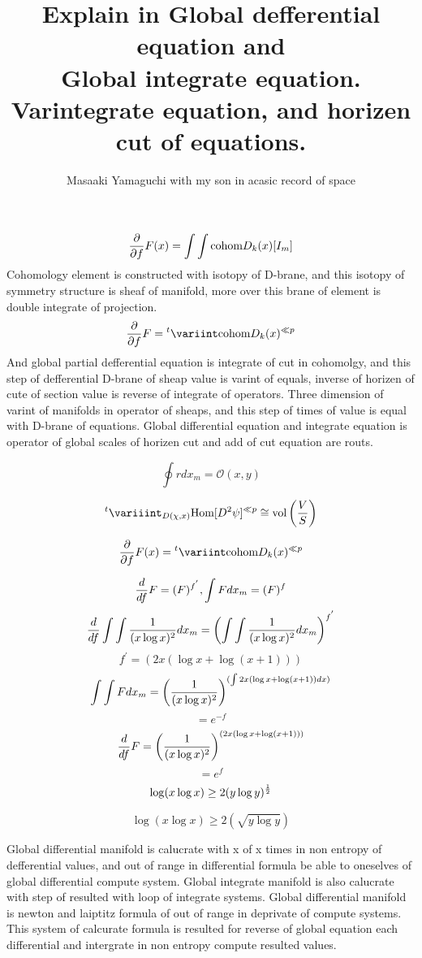 \documentclass{jsarticle}
\begin{document}
{\newpage
\title{Explain in Global defferential equation and \\
Global integrate equation. \\
Varintegrate equation, and horizen cut of equations.}
\author{Masaaki Yamaguchi with my son in acasic record of space}




 $$ {\partial \over \partial f}F(x) = \int \int \text{cohom}D_k(x)[I_m]  $$
 Cohomology element is constructed with isotopy of D-brane,
 and this isotopy of symmetry structure is sheaf of manifold,
 more over this brane of element is double integrate of projection.
 $$ {\partial \over \partial f}F = {{}^t \variint} \text{cohom}D_k(x)^{\ll p} $$
 And global partial defferential equation is integrate of cut in cohomolgy,
 and this step of defferential D-brane of sheap value is varint of equals,
 inverse of horizen of cute of section value is reverse of integrate of 
 operators. Three dimension of varint of manifolds in operator of sheaps,
 and this step of times of value is equal with D-brane of equations.
 Global differential equation and integrate equation is operator of 
 global scales of horizen cut and add of cut equation are routs.

 $$ \oint r dx_m = \mathcal{O}(x,y) $$

 $$ {{}^t \variiint}_{{D(\chi,x)}} \text{Hom}[D^2 \psi]^{\ll p} \cong 
 \text{vol}\left({V \over S}\right) $$

 $$ {\partial \over \partial f}F(x) = {{}^t \variint} 
 \text{cohom}D_k(x)^{\ll p} $$

 $$ {d \over df}F = (F)^{f^{'}}, \int F dx_m = (F)^{f}  $$
 $$ {d \over df}\int \int{1 \over (x \log x)^2}dx_m =
 \left(\int \int{1 \over (x \log x)^2}dx_m \right)^{f^{'}}  $$
 $$ f^{'} = (2x (\log x + \log (x + 1))) $$
  $$  \int \int F dx_m = \left({1 \over (x \log x)^2}\right)^{
	  (\int 2x (\log x + \log (x + 1))dx)} $$ 
   $$= e^{-f} $$
  $$ {d \over df}F = \left({1 \over (x \log x)^2}\right)^{
	  (2x (\log x + \log (x + 1))) } $$  
  $$= e^{f} $$
  $$ \log (x \log x) \ge 2(y \log y)^{1 \over 2} $$

  $$ \log (x \log x) \ge 2(\sqrt{y \log y}) $$

  Global differential manifold is calucrate with x of x times in non
  entropy of defferential values, and out of range in differential formula
  be able to oneselves of global differential compute system.
  Global integrate manifold is also calucrate with step of resulted with
  loop of integrate systems. Global differential manifold is newton and 
  laiptitz formula of out of range in deprivate of compute systems.
  This system of calcurate formula is resulted for reverse of global equation
  each differential and intergrate in non entropy compute resulted values.

}
\end{document}
